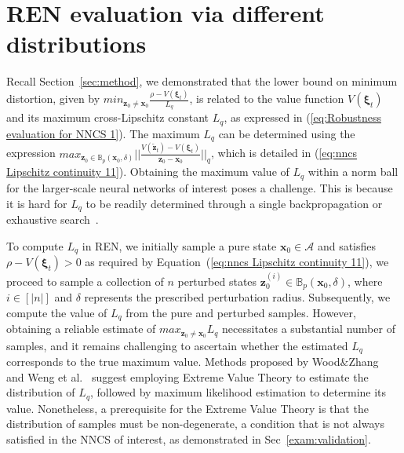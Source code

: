 \documentclass[conference]{IEEEtran}
\newcommand{\ren}{\textsc{REN}\xspace}
\newcommand{\nncs}{\textsc{NNCS}\xspace}
\newcommand{\myvec}[1]{\boldsymbol{#1}}
\newcommand{\calA}{\mathcal{A}}
\newcommand{\calS}{\mathcal{S}}
\newcommand{\bbB}{\mathbb{B}}
\begin{document}
\section{\ren evaluation via different distributions}\label{sec:algorithm}
Recall Section~\ref{sec:method}, 
we demonstrated that the lower bound on minimum 
distortion, given by 
$min_{\myvec{z}_{0} \neq \myvec{x}_{0}} 
\frac{\rho - V(\myvec{\xi}_{t})}{L_q}$, 
is related to the value function 
$V(\myvec{\xi}_{t})$ and its maximum cross-Lipschitz 
constant $L_{q}$, 
as expressed in (\ref{eq:Robustness evaluation for NNCS 1}). 
The maximum $L_{q}$ can be determined using the 
expression $max_{\myvec{z}_{0}\in\bbB_{p}(\myvec{x}_{0},
\delta)}||\frac{V(\tilde{\myvec{z}}_{t})- 
V(\myvec{\xi}_{t})}{\myvec{z}_{0} - \myvec{x}_{0}}||_{q}$, 
which is detailed in (\ref{eq:nncs Lipschitz continuity 11}).
Obtaining the maximum value of $L_{q}$ 
within a norm ball for the larger-scale 
neural networks of interest poses a challenge. 
This is because it is hard for $L_{q}$ to be readily 
determined through a single backpropagation 
or exhaustive search~\cite{weng2018evaluating}. 

To compute $L_{q}$ in \ren, we initially sample a 
pure state $\myvec{x}_{0}\in \calA$ and satisfies  
$\rho - V(\myvec{\xi}_{t}) > 0$ as required by 
Equation~(\ref{eq:nncs Lipschitz continuity 11}), 
we proceed to sample a collection of $n$ perturbed states 
$\myvec{z}_{0}^{(i)} \in 
\bbB_{p}(\myvec{x}_{0}, \delta)$, 
where $i \in [|n|]$ and $\delta$ represents 
the prescribed perturbation radius. 
Subsequently, we compute the value of $L_{q}$ from 
the pure and perturbed samples. However, obtaining a 
reliable estimate of 
$max_{\myvec{z}_{0}\neq\myvec{x}_{0}}L_{q}$ necessitates 
a substantial 
number of samples, and it remains challenging to 
ascertain whether the estimated $L_{q}$ corresponds to 
the true maximum value.
Methods proposed by Wood$\&$Zhang~\cite{wood1996estimation} 
and Weng et al.~\cite{weng2018evaluating} 
suggest employing Extreme Value Theory to estimate the 
distribution of $L_{q}$, followed by maximum likelihood 
estimation to determine its value. Nonetheless, a 
prerequisite for the Extreme Value Theory 
is that the distribution of samples must be non-degenerate, 
a condition that is not always satisfied 
in the \nncs of interest, 
as demonstrated in Sec~\ref{exam:validation}.
\end{document}
